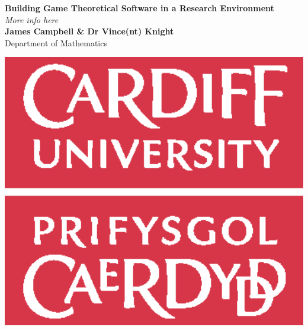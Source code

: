 \documentclass[a1,landscape]{a0poster}
\begin{document}

\begin{minipage}[b]{0.6\linewidth}
\veryHuge \color{NavyBlue} \textbf{Building Game Theoretical Software in a Research Environment} \color{Black}\\ %
\Huge\textit{More info here}\\[1cm] %
\huge \textbf{James Campbell \& Dr Vince(nt) Knight}\\ %
\huge Department of Mathematics\\ %
\end{minipage}
%
%
\begin{minipage}[b]{0.4\linewidth}
\centering
\includegraphics[width=15cm]{images/logo.eps}
\end{minipage}
\end{document}
